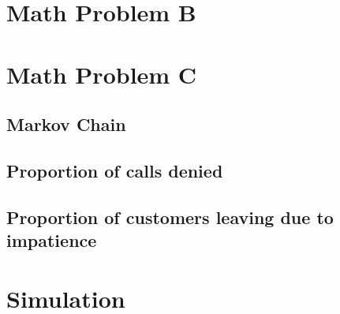 \documentclass[10pt,a4paper]{article}
\begin{document}
\section{Math Problem B}

\section{Math Problem C}
\subsection{Markov Chain}


\subsection{Proportion of calls denied}
\subsection{Proportion of customers leaving due to impatience}

\section{Simulation}
\end{document}
